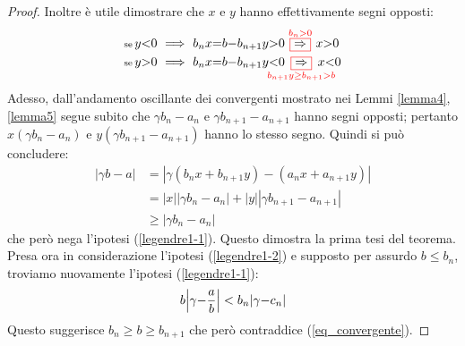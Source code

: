 \documentclass[twoside,symmetric,justified,openany,nobib]{tufte-book}
\begin{document}
\begin{proof}
  \bigskip
  \noindent
  Inoltre è utile dimostrare che $x$ e $y$ hanno effettivamente segni opposti:
  \[
    \begin{split}
      & \text{\scriptsize se}\, y{<}0\ \Longrightarrow\ b_nx{=}b{-}b_{n+1}y{>}0 \hspace{3pt} {\color{red}\overset{b_n{>}0}{\boxed{\color{black}\Rightarrow}}} \hspace{3pt} x{>}0\\
      & \text{\scriptsize se}\, y{>}0\ \Longrightarrow\ b_nx{=}b{-}b_{n+1}y{<}0 \hspace{-14pt} {\color{red}\underset{b_{n+1}y{\geq}b_{n+1}{>}b}{\boxed{\color{black}\Rightarrow}}} \hspace{-14pt} x{<}0
    \end{split}
  \]
  Adesso, dall'andamento oscillante dei convergenti mostrato nei Lemmi \ref{lemma4}, \ref{lemma5} segue subito che $\gamma b_n{-}a_n$ e $\gamma b_{n+1}{-}a_{n+1}$ hanno segni opposti; pertanto $x(\gamma b_n{-}a_n)$ e $y(\gamma b_{n+1}{-}a_{n+1})$ hanno lo stesso segno. Quindi si può concludere:
  \[
    \begin{split}
      |\gamma b{-}a| & = |\gamma(b_nx{+}b_{n+1}y)-(a_nx{+}a_{n+1}y)|\\
      & = |x||\gamma b_n{-}a_n| + |y||\gamma b_{n+1}{-}a_{n+1}|\\
      & \geq |\gamma b_n{-}a_n|
    \end{split}
  \]
  che però nega l'ipotesi (\ref{legendre1-1}). Questo dimostra la prima tesi del teorema. Presa ora in considerazione l'ipotesi (\ref{legendre1-2}) e supposto per assurdo $b{\leq}b_n$, troviamo nuovamente l'ipotesi (\ref{legendre1-1}):
  \[
    b\Bigl| \gamma {-}\frac{a}{b} \Bigr| < b_n|\gamma {-}c_n|
  \]
  Questo suggerisce $b_n{\geq}b{\geq}b_{n+1}$ che però contraddice (\ref{eq_convergente}).
\end{proof}
\end{document}
